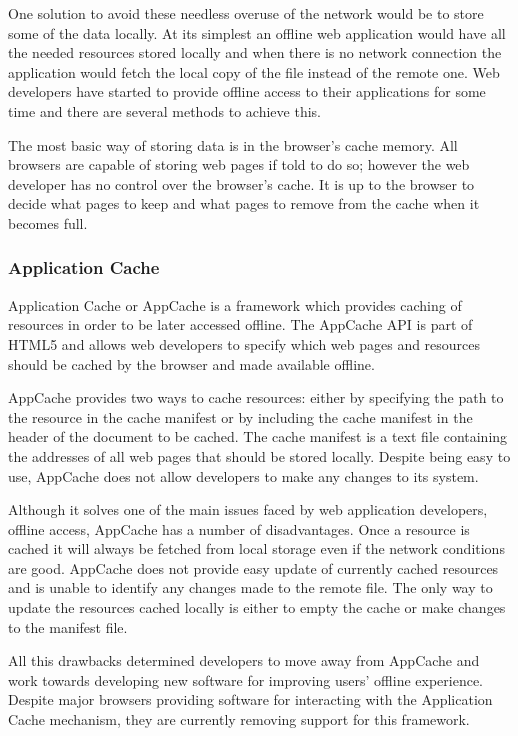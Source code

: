 \documentclass[10pt,a4paper,twoside]{book}
\begin{document}
One solution to avoid these needless overuse of the network would be to store some of the data locally. At its simplest an offline web application would have all the needed resources stored locally and when there is no network connection the application would fetch the local copy of the file instead of the remote one.  Web developers have started to provide offline access to their applications for some time and there are several methods to achieve this.

The most basic way of storing data is in the browser's cache memory. All browsers are capable of storing web pages if told to do so; however the web developer has no control over the browser's cache. It is up to the browser to decide what pages to keep and what pages to remove from the cache when it becomes full. 

\subsubsection{Application Cache}
\label{applicationcachetb}
Application Cache \cite{appcache} or AppCache is a framework which provides caching of resources in order to be later accessed offline. The AppCache API is part of HTML5 and allows web developers to specify which web pages and resources should be cached by the browser and made available offline.

AppCache provides two ways to cache resources: either by specifying the path to the resource in the cache manifest or by including the cache manifest in the header of the document to be cached. The cache manifest is a text file containing the addresses of all web pages that should be stored locally. Despite being easy to use, AppCache does not allow developers to make any changes to its system. 

Although it solves one of the main issues faced by web application developers, offline access, AppCache has a number of disadvantages. Once a resource is cached it will always be fetched from local storage even if the network conditions are good. AppCache does not provide easy update of currently cached resources and is unable to identify any changes made to the remote file. The only way to update the resources cached locally is either to empty the cache or make changes to the manifest file.

All this drawbacks determined developers to move away from AppCache and work towards developing new software for improving users' offline experience. Despite major browsers providing software for interacting with the Application Cache mechanism, they are currently removing support for this framework.
\end{document}
